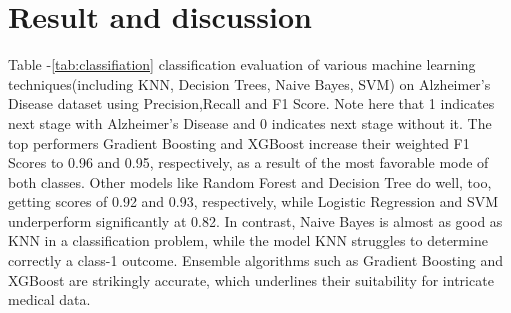 \documentclass[conference]{IEEEtran} %
\begin{document}
\section{Result and discussion}
Table -\ref{tab:classifiation} classification evaluation of various machine learning techniques(including KNN, Decision Trees, Naive Bayes, SVM) on Alzheimer’s Disease dataset using Precision,Recall and F1 Score. Note here that 1 indicates next stage with Alzheimer's Disease and 0 indicates next stage without it.
The top performers Gradient Boosting and XGBoost increase their weighted F1 Scores to 0.96 and 0.95, respectively, as a result of the most favorable mode of both classes. Other models like Random Forest and Decision Tree do well, too, getting scores of 0.92 and 0.93, respectively, while Logistic Regression and SVM underperform significantly at 0.82. In contrast, Naive Bayes is almost as good as KNN in a classification problem, while the model KNN struggles to determine correctly a class-1 outcome.
Ensemble algorithms such as Gradient Boosting and XGBoost are strikingly accurate, which underlines their suitability for intricate medical data. 
\end{document}
